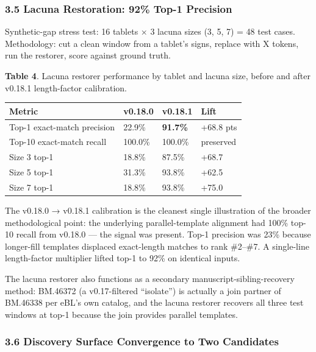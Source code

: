 \documentclass[
  11pt,
  letterpaper,
]{article}
\newcounter{none} %
\begin{document}
\subsubsection{3.5 Lacuna Restoration: 92\% Top-1
Precision}\label{lacuna-restoration-92-top-1-precision}

Synthetic-gap stress test: 16 tablets × 3 lacuna sizes (3, 5, 7) = 48
test cases. Methodology: cut a clean window from a tablet's signs,
replace with X tokens, run the restorer, score against ground truth.

\textbf{Table 4}. Lacuna restorer performance by tablet and lacuna size,
before and after v0.18.1 length-factor calibration.

{\def\LTcaptype{none} %
\begin{longtable}[]{@{}llll@{}}
\toprule\noalign{}
Metric & v0.18.0 & v0.18.1 & Lift \\
\midrule\noalign{}
\endhead
\bottomrule\noalign{}
\endlastfoot
Top-1 exact-match precision & 22.9\% & \textbf{91.7\%} & +68.8 pts \\
Top-10 exact-match recall & 100.0\% & 100.0\% & preserved \\
Size 3 top-1 & 18.8\% & 87.5\% & +68.7 \\
Size 5 top-1 & 31.3\% & 93.8\% & +62.5 \\
Size 7 top-1 & 18.8\% & 93.8\% & +75.0 \\
\end{longtable}
}

The v0.18.0 → v0.18.1 calibration is the cleanest single illustration of
the broader methodological point: the underlying parallel-template
alignment had 100\% top-10 recall from v0.18.0 --- the signal was
present. Top-1 precision was 23\% because longer-fill templates
displaced exact-length matches to rank \#2--\#7. A single-line
length-factor multiplier lifted top-1 to 92\% on identical inputs.

The lacuna restorer also functions as a secondary
manuscript-sibling-recovery method: BM.46372 (a v0.17-filtered
``isolate'') is actually a join partner of BM.46338 per eBL's own
catalog, and the lacuna restorer recovers all three test windows at
top-1 because the join provides parallel templates.

\subsubsection{3.6 Discovery Surface Convergence to Two
Candidates}\label{discovery-surface-convergence-to-two-candidates}
\end{document}
